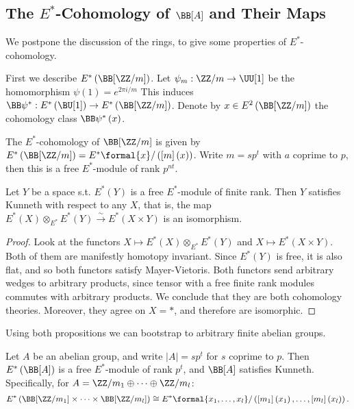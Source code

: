 \subsection{The \texorpdfstring{$E^*$}{E*}-Cohomology of \texorpdfstring{$\BB[A]$}{BA} and Their Maps}

We postpone the discussion of the rings, to give some properties of $E^*$-cohomology.

First we describe $E^*\left(\BB[\ZZ/m]\right)$.
Let $\psi_m: \ZZ/m \to \UU[1]$ be the homomorphism $\psi\left(1\right) = e^{2\pi i/m}$
This induces $\BB\psi^*: E^*\left(\BU[1]\right) \to E^*\left(\BB[\ZZ/m]\right)$.
Denote by $x \in E^2\left(\BB[\ZZ/m]\right)$ the cohomology class $\BB\psi^*\left(x\right)$.

\begin{proposition}
	The $E^*$-cohomology of $\BB[\ZZ/m]$ is given by $E^*\left(\BB[\ZZ/m]\right) = E^*\formal{x} / \left(\left[m\right]\left(x\right)\right)$.
	Write $m = sp^t$ with $a$ coprime to $p$, then this is a free $E^*$-module of rank $p^{nt}$.
\end{proposition}

\begin{proposition}
	Let $Y$ be a space s.t. $E^*\left(Y\right)$ is a free $E^*$-module of finite rank.
	Then $Y$ satisfies Kunneth with respect to any $X$, that is, the map $E^*\left(X\right) \otimes_{E^*} E^*\left(Y\right) \xrightarrow{\sim} E^*\left(X \times Y\right)$ is an isomorphism.
\end{proposition}

\begin{proof}
	Look at the functors $X \mapsto E^*\left(X\right) \otimes_{E^*} E^*\left(Y\right)$ and $X \mapsto E^*\left(X \times Y\right)$.
	Both of them are manifestly homotopy invariant.
	Since $E^*\left(Y\right)$ is free, it is also flat, and so both functors satisfy Mayer-Vietoris.
	Both functors send arbitrary wedges to arbitrary products, since tensor with a free finite rank modules commutes with arbitrary products.
	We conclude that they are both cohomology theories.
	Moreover, they agree on $X = *$, and therefore are isomorphic.
\end{proof}

Using both propositions we can bootstrap to arbitrary finite abelian groups.

\begin{proposition}\label{E-B-abelian}
	Let $A$ be an abelian group, and write $\left|A\right| = sp^t$ for $s$ coprime to $p$.
	Then $E^*\left(\BB[A]\right)$ is a free $E^*$-module of rank $p^t$, and $\BB[A]$ satisfies Kunneth.
	Specifically, for $A = \ZZ/m_1 \oplus \cdots \oplus \ZZ/m_l$:
	$$
	E^*\left(\BB[\ZZ/m_1] \times \cdots \times \BB[\ZZ/m_l]\right)
	\cong E^*\formal{x_1, \dotsc, x_l}/\left(\left[m_1\right]\left(x_1\right), \dotsc, \left[m_l\right]\left(x_l\right)\right).
	$$
\end{proposition}

